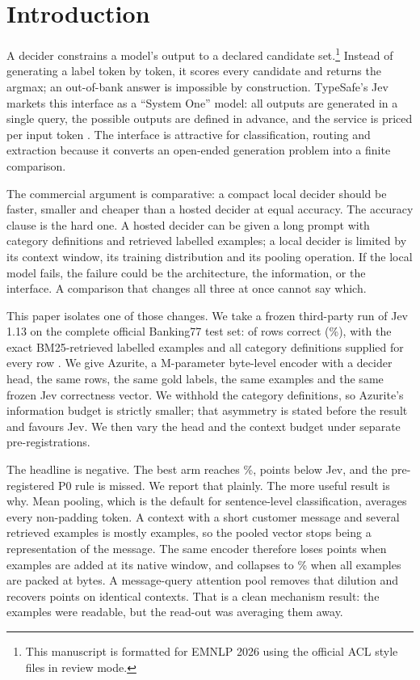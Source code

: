 \documentclass[11pt]{article}
\begin{document}
\section{Introduction}

A decider constrains a model's output to a declared candidate set.\footnote{This
manuscript is formatted for EMNLP 2026 using the official ACL style files in
review mode.} Instead of generating a label token by token, it scores every
candidate and returns the argmax; an out-of-bank answer is impossible by
construction. TypeSafe's Jev
markets this interface as a ``System One'' model: all outputs are generated in a
single query, the possible outputs are defined in advance, and the service is
priced per input token \citep{typesafe2026jev}. The interface is attractive for
classification, routing and extraction because it converts an open-ended
generation problem into a finite comparison.

The commercial argument is comparative: a compact local decider should be
faster, smaller and cheaper than a hosted decider at equal accuracy. The
accuracy clause is the hard one. A hosted decider can be given a long prompt
with category definitions and retrieved labelled examples; a local decider is
limited by its context window, its training distribution and its pooling
operation. If the local model fails, the failure could be the architecture, the
information, or the interface. A comparison that changes all three at once
cannot say which.

This paper isolates one of those changes. We take a frozen third-party run of
Jev 1.13 on the complete official Banking77 test set: \PJevCorrect{} of \PN{}
rows correct (\PJevAcc\%), with the exact \PExamples{} BM25-retrieved labelled
examples and all \PLabels{} category definitions supplied for every row
\citep{smith2026jevbanking}. We give Azurite, a \PParamsM{}M-parameter
byte-level encoder with a decider head, the same rows, the same gold labels,
the same \PExamples{} examples and the same frozen Jev correctness vector. We
withhold the category definitions, so Azurite's information budget is strictly
smaller; that asymmetry is stated before the result and favours Jev. We then
vary the head and the context budget under separate pre-registrations.

The headline is negative. The best arm reaches \PQueryTwoAcc\%, \PQueryGapAbs{}
points below Jev, and the pre-registered P0 rule is missed. We report that
plainly. The more useful result is why. Mean pooling, which is the default for
sentence-level classification, averages every non-padding token. A context with
a short customer message and several retrieved examples is mostly examples, so
the pooled vector stops being a representation of the message. The same encoder
therefore loses \POldTwoGap{} points when examples are added at its native
window, and collapses to \POldLenAcc\% when all \PExamples{} examples are packed
at \PSeq{} bytes. A message-query attention pool removes that dilution and
recovers \PMechGain{} points on identical contexts. That is a clean mechanism
result: the examples were readable, but the read-out was averaging them away.
\end{document}
